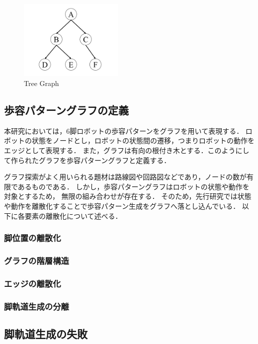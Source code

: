 \begin{figure}[tbp]
  \begin{center}
    \includegraphics[width=50mm, clip]{figure/tree_graph.png}
   \caption{Tree Graph}
    \label{fig:tree_graph}
  \end{center}
\end{figure}

\subsection{歩容パターングラフの定義}
本研究においては，6脚ロボットの歩容パターンをグラフを用いて表現する．
ロボットの状態をノードとし，ロボットの状態間の遷移，つまりロボットの動作をエッジとして表現する．
また，グラフは有向の根付き木とする．このようにして作られたグラフを歩容パターングラフと定義する．

グラフ探索がよく用いられる題材は路線図や回路図などであり，ノードの数が有限であるものである．
しかし，歩容パターングラフはロボットの状態や動作を対象とするため，
無限の組み合わせが存在する．
そのため，先行研究では状態や動作を離散化することで歩容パターン生成をグラフへ落とし込んでいる．
以下に各要素の離散化について述べる．

\subsubsection{脚位置の離散化}

\subsubsection{グラフの階層構造}
\subsubsection{エッジの離散化}
\subsubsection{脚軌道生成の分離}

\subsection{脚軌道生成の失敗}


